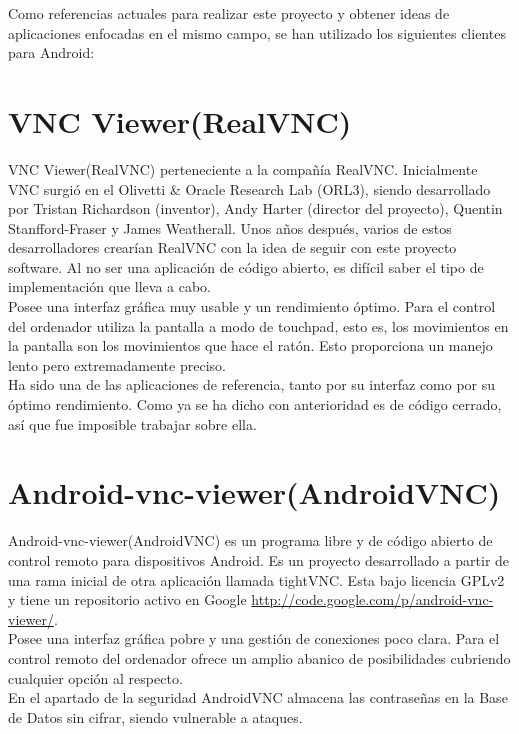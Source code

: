Como referencias actuales para realizar este proyecto y obtener ideas de aplicaciones enfocadas en el mismo campo, se han utilizado los siguientes clientes para Android:
\section{VNC Viewer(RealVNC)}
VNC Viewer(RealVNC) \cite{wiki:realvnc} perteneciente a la compañía RealVNC. Inicialmente VNC surgió en el Olivetti \& Oracle Research Lab (ORL3), siendo desarrollado por Tristan Richardson (inventor), Andy Harter (director del proyecto), Quentin Stanfford-Fraser y James Weatherall. Unos años después, varios de estos desarrolladores crearían RealVNC con la idea de seguir con este proyecto software. Al no ser una aplicación de código abierto, es difícil saber el tipo de implementación que lleva a cabo.\\

Posee una interfaz gráfica muy usable y un rendimiento óptimo. Para el control del ordenador utiliza la pantalla a modo de touchpad, esto es, los movimientos en la pantalla son los movimientos que hace el ratón. Esto proporciona un manejo lento pero extremadamente preciso.\\

Ha sido una de las aplicaciones de referencia, tanto por su interfaz como por su óptimo rendimiento. Como ya se ha dicho con anterioridad es de código cerrado, así que fue imposible trabajar sobre ella.
\newpage
\section{Android-vnc-viewer(AndroidVNC)}
Android-vnc-viewer(AndroidVNC) \cite{androidvnc:androidvnc} es un programa libre y de código abierto de control remoto para dispositivos Android. Es un proyecto desarrollado a partir de una rama inicial de otra aplicación llamada tightVNC. Esta bajo licencia GPLv2 y tiene un repositorio activo en Google \url{http://code.google.com/p/android-vnc-viewer/}.\\

Posee una interfaz gráfica pobre y una gestión de conexiones poco clara. Para el control remoto del ordenador ofrece un amplio abanico de posibilidades cubriendo cualquier opción al respecto.\\

En el apartado de la seguridad AndroidVNC almacena las contraseñas en la Base de Datos sin cifrar, siendo vulnerable a ataques.\\

